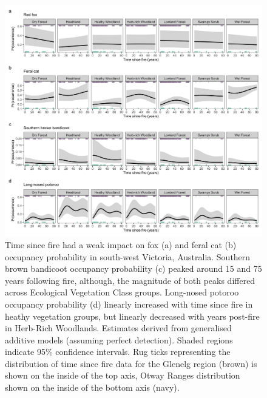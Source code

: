 \documentclass[]{elsarticle} %
\begin{document}
\begin{figure}

{\centering \includegraphics[width=0.8\linewidth]{../figs/tsf} 

}

\caption{Time since fire had a weak impact on fox (a) and feral cat (b) occupancy probability in south-west Victoria, Australia. Southern brown bandicoot occupancy probability (c) peaked around 15 and 75 years following fire, although, the magnitude of both peaks differed across Ecological Vegetation Class groups. Long-nosed potoroo occupancy probability (d) linearly increased with time since fire in heathy vegetation groups, but linearly decreased with years post-fire in Herb-Rich Woodlands. Estimates derived from generalised additive models (assuming perfect detection). Shaded regions indicate 95\% confidence intervals. Rug ticks representing the distribution of time since fire data for the Glenelg region (brown) is shown on the inside of the top axis, Otway Ranges distribution shown on the inside of the bottom axis (navy).}\label{fig:occ-tsf}
\end{figure}
\end{document}
